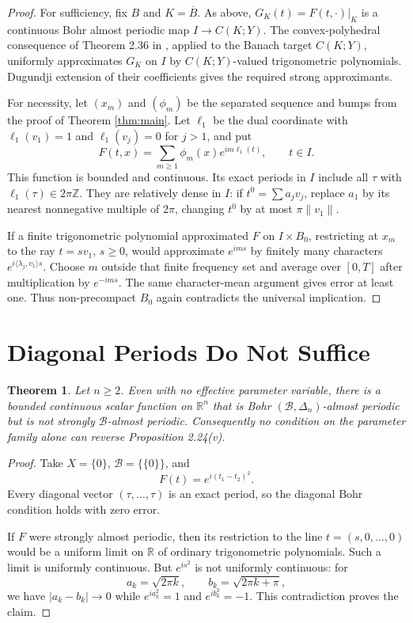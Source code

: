 \documentclass[11pt]{article}
\newtheorem{theorem}{Theorem}
\newcommand{\R}{\mathbb R}
\newcommand{\B}{\mathcal B}
\newcommand{\ip}[2]{\langle #1,#2\rangle}
\begin{document}
\begin{proof}
For sufficiency, fix $B$ and $K=\overline B$.  As above,
$G_K(t)=F(t,\cdot)|_K$ is a continuous Bohr almost periodic map
$I\to C(K;Y)$.  The convex-polyhedral consequence of Theorem 2.36 in
\cite{CKKP}, applied to the Banach target $C(K;Y)$, uniformly approximates
$G_K$ on $I$ by $C(K;Y)$-valued trigonometric polynomials.  Dugundji
extension of their coefficients gives the required strong approximants.

For necessity, let $(x_m)$ and $(\phi_m)$ be the separated sequence and
bumps from the proof of Theorem \ref{thm:main}.  Let $\ell_1$ be the dual
coordinate with $\ell_1(v_1)=1$ and $\ell_1(v_j)=0$ for $j>1$, and put
\[
 F(t,x)=\sum_{m\geq1}\phi_m(x)e^{im\ell_1(t)},\qquad t\in I.
\]
This function is bounded and continuous.  Its exact periods in $I$ include
all $\tau$ with $\ell_1(\tau)\in2\pi\mathbb Z$.  They are relatively dense
in $I$: if $t^0=\sum a_jv_j$, replace $a_1$ by its nearest nonnegative
multiple of $2\pi$, changing $t^0$ by at most $\pi\|v_1\|$.

If a finite trigonometric polynomial approximated $F$ on $I\times B_0$,
restricting at $x_m$ to the ray $t=sv_1$, $s\geq0$, would approximate
$e^{ims}$ by finitely many characters $e^{i\ip{\lambda_j}{v_1}s}$.  Choose
$m$ outside that finite frequency set and average over $[0,T]$ after
multiplication by $e^{-ims}$.  The same character-mean argument gives error
at least one.  Thus non-precompact $B_0$ again contradicts the universal
implication.
\end{proof}

\section*{Diagonal Periods Do Not Suffice}

\begin{theorem}\label{thm:diagonal}
Let $n\geq2$.  Even with no effective parameter variable, there is a bounded
continuous scalar function on $\R^n$ that is Bohr
$(\B,\Delta_n)$-almost periodic but is not strongly $\B$-almost periodic.
Consequently no condition on the parameter family alone can reverse
Proposition 2.24(v).
\end{theorem}

\begin{proof}
Take $X=\{0\}$, $\B=\{\{0\}\}$, and
\[
 F(t)=e^{i(t_1-t_2)^2}.
\]
Every diagonal vector $(\tau,\ldots,\tau)$ is an exact period, so the
diagonal Bohr condition holds with zero error.

If $F$ were strongly almost periodic, then its restriction to the line
$t=(s,0,\ldots,0)$ would be a uniform limit on $\R$ of ordinary
trigonometric polynomials.  Such a limit is uniformly continuous.  But
$e^{is^2}$ is not uniformly continuous: for
\[
 a_k=\sqrt{2\pi k},\qquad b_k=\sqrt{2\pi k+\pi},
\]
we have $|a_k-b_k|\to0$ while $e^{ia_k^2}=1$ and $e^{ib_k^2}=-1$.
This contradiction proves the claim.
\end{proof}
\end{document}
